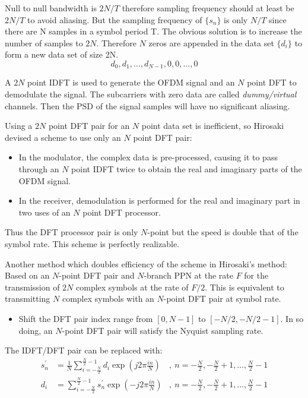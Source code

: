 Null to null bandwidth is $2N/T$ therefore sampling frequency should at least be $2N/T$ to avoid \gls{aliasing}. But the sampling frequency of $\{ s_n\}$ is only $N/T$ since there are N samples in a symbol period T. The obvious solution is to increase the number of samples to $2N$. Therefore $N$ zeros are appended in the data set $\{ d_i\}$ to form a new data set of size 2N.
$$d_0,d_1,\ldots,d_{N-1}, 0,0,\ldots,0$$

A $2N$ point \gls{IDFT} is used to generate the \gls{OFDM} signal and an $N$ point \gls{DFT} to demodulate the signal. The subcarriers with zero data are called \textit{dummy/virtual} channels. Then the \gls{PSD} of the signal samples will have no significant \gls{aliasing}.

Using a $2N$ point \gls{DFT} pair for an $N$ point data set is inefficient, so Hirosaki\cite{hirosaki} devised a scheme to use only an $N$ point \gls{DFT} pair:
\begin{itemize}
	\item In the modulator, the complex data is pre-processed, causing it to pass through an $N$ point \gls{IDFT} twice to obtain the real and imaginary parts of the \gls{OFDM} signal.
	\item In the receiver, demodulation is performed for the real and imaginary part in two uses of an $N$ point \gls{DFT} processor.
\end{itemize}
Thus the \gls{DFT} processor pair is only $N$-point but the speed is double that of the symbol rate. This scheme is perfectly realizable\cite{hirosaki}.

Another method which doubles efficiency of the scheme in Hirosaki's method: Based on an $N$-point \gls{DFT} pair and $N$-branch PPN at the rate $F$ for the transmission of $2N$ complex symbols at the rate of $F/2$. This is equivalent to transmitting $N$ complex symbols with an $N$-point \gls{DFT} pair at symbol rate.
\begin{itemize}
	\item Shift the \gls{DFT} pair index range from $[0,N-1]$ to $[-N/2, -N/2-1]$. In so doing, an $N$-point \gls{DFT} pair will satisfy the Nyquist sampling rate.
\end{itemize}

The \gls{IDFT}/\gls{DFT} pair can be replaced with:
\begin{align*}
s_n^\prime &= \frac{1}{N}\sum_{i=-\frac{N}{2}}^{\frac{N}{2}-1}d_i\exp\left( j2\pi\frac{in}{N}\right)&,\ n = -\frac{N}{2},-\frac{N}{2}+1,\ldots,\frac{N}{2}-1\\
d_i &= \sum_{i=-\frac{N}{2}}^{\frac{N}{2}-1}s_n^\prime\exp\left( -j2\pi\frac{in}{N}\right)&,\ n = -\frac{N}{2},-\frac{N}{2}+1,\ldots,\frac{N}{2}-1\\
\end{align*}

